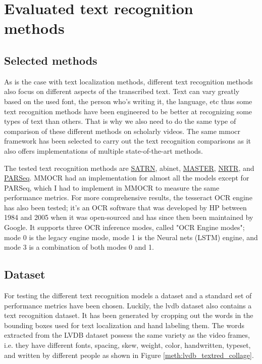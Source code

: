 \section{Evaluated text recognition methods}

\subsection{Selected methods}

As is the case with text localization methods, different text recognition methods also focus on different aspects of the transcribed text. Text can vary greatly based on the used font, the person who's writing it, the language, etc thus some text recognition methods have been engineered to be better at recognizing some types of text than others. That is why we also need to do the same type of comparison of these different methods on scholarly videos. The same \gls{mmocr} framework has been selected to carry out the text recognition comparisons as it also offers implementations of multiple state-of-the-art methods.

The tested text recognition methods are \hyperref[satrn]{SATRN}, \gls{abinet}, \hyperref[master]{MASTER}, \hyperref[nrtr]{NRTR}, and \hyperref[parseq]{PARSeq}.
MMOCR had an implementation for almost all the models except for PARSeq, which I had to implement in MMOCR to measure the same performance metrics.
For more comprehensive results, the tesseract OCR engine has also been tested; it's an OCR software that was developed by HP between 1984 and 2005 when it was open-sourced and has since then been maintained by Google. It supports three OCR inference modes, called "OCR Engine modes"; mode 0 is the legacy engine mode, mode 1 is the Neural nets (LSTM) engine, and mode 3 is a combination of both modes 0 and 1.

\subsection{Dataset}

For testing the different text recognition models a dataset and a standard set of performance metrics have been chosen. Luckily, the \gls{lvdb} dataset also contains a text recognition dataset. It has been generated by cropping out the words in the bounding boxes used for text localization and hand labeling them. The words extracted from the LVDB dataset possess the same variety as the video frames, i.e. they have different fonts, spacing, skew, weight, color, handwritten, typeset, and written by different people as shown in Figure \ref{meth:lvdb_textred_collage}.

